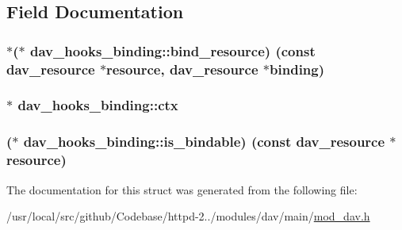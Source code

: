 \subsection{Field Documentation}
\subsubsection[{\texorpdfstring{bind\+\_\+resource}{bind_resource}}]{$\ast$($\ast$ dav\+\_\+hooks\+\_\+binding\+::bind\+\_\+resource) (const {\bf dav\+\_\+resource} $\ast${\bf resource}, {\bf dav\+\_\+resource} $\ast$binding)}\hypertarget{structdav__hooks__binding_a4ad46af410100f691fc09c896e14d2d2}{}\label{structdav__hooks__binding_a4ad46af410100f691fc09c896e14d2d2}
\subsubsection[{\texorpdfstring{ctx}{ctx}}]{$\ast$ dav\+\_\+hooks\+\_\+binding\+::ctx}\hypertarget{structdav__hooks__binding_a0a8be30bc02a9f5463b69e25db878fc2}{}\label{structdav__hooks__binding_a0a8be30bc02a9f5463b69e25db878fc2}
\subsubsection[{\texorpdfstring{is\+\_\+bindable}{is_bindable}}]{($\ast$ dav\+\_\+hooks\+\_\+binding\+::is\+\_\+bindable) (const {\bf dav\+\_\+resource} $\ast${\bf resource})}\hypertarget{structdav__hooks__binding_a89e4c0f2a77605a07f516b97a8ce1b53}{}\label{structdav__hooks__binding_a89e4c0f2a77605a07f516b97a8ce1b53}


The documentation for this struct was generated from the following file\+:\begin{DoxyCompactItemize}
\item 
/usr/local/src/github/\+Codebase/httpd-\/2../modules/dav/main/\hyperlink{mod__dav_8h}{mod\+\_\+dav.\+h}\end{DoxyCompactItemize}
